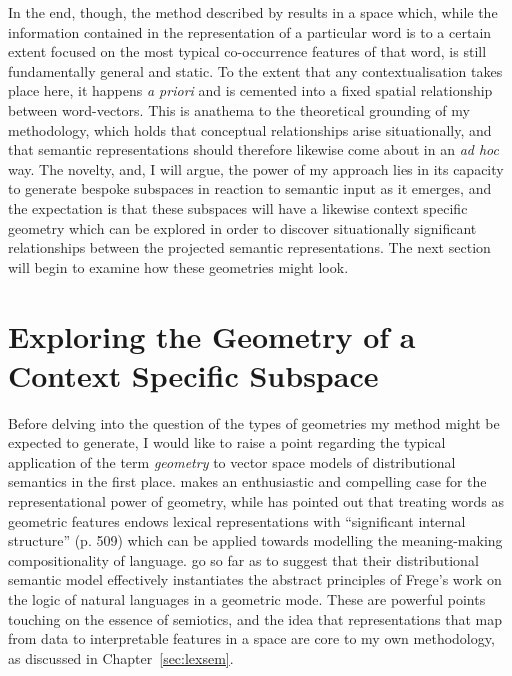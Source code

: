 In the end, though, the method described by \citeauthor{PolajnarEA2014} results in a space which, while the information contained in the representation of a particular word is to a certain extent focused on the most typical co-occurrence features of that word, is still fundamentally general and static.  To the extent that any contextualisation takes place here, it happens \emph{a priori} and is cemented into a fixed spatial relationship between word-vectors.  This is anathema to the theoretical grounding of my methodology, which holds that conceptual relationships arise situationally, and that semantic representations should therefore likewise come about in an \emph{ad hoc} way.  The novelty, and, I will argue, the power of my approach lies in its capacity to generate bespoke subspaces in reaction to semantic input as it emerges, and the expectation is that these subspaces will have a likewise context specific geometry which can be explored in order to discover situationally significant relationships between the projected semantic representations.  The next section will begin to examine how these geometries might look.

\section{Exploring the Geometry of a Context Specific Subspace} \label{sec:geotext}
Before delving into the question of the types of geometries my method might be expected to generate, I would like to raise a point regarding the typical application of the term \emph{geometry} to vector space models of distributional semantics in the first place.  \cite{Widdows2004} makes an enthusiastic and compelling case for the representational power of geometry, while \cite{Clark2015} has pointed out that treating words as geometric features endows lexical representations with ``significant internal structure'' (p. 509) which can be applied towards modelling the meaning-making compositionality of language.  \cite{BaroniEA2014b} go so far as to suggest that their distributional semantic model effectively instantiates the abstract principles of Frege's work on the logic of natural languages \citep{Dummett1981} in a geometric mode.  These are powerful points touching on the essence of semiotics, and the idea that representations that map from data to interpretable features in a space are core to my own methodology, as discussed in Chapter~\ref{sec:lexsem}.

